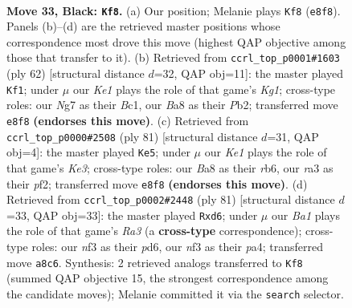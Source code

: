 \documentclass[11pt]{article}
\begin{document}
\clearpage

\begin{figure}[p]\centering
\begin{subfigure}{0.46\textwidth}\centering
\resizebox{\linewidth}{!}{%
\newchessgame
\chessboard[
  setfen={b3k3/P4pn1/6p1/4P3/5K2/R4N1P/4r3/3N4 b - - 2 33},
  showmover=false,
  pgfstyle=straightmove, color=movearrow, markmove={e8-f8}
]}
\caption{}
\end{subfigure}\hfill
\begin{subfigure}{0.46\textwidth}\centering
\resizebox{\linewidth}{!}{%
\newchessgame
\chessboard[
  setfen={r3n3/4pk2/2R3p1/8/p7/6P1/1P3P2/2B3K1 w - - 0 32},
  showmover=false,
  pgfstyle=straightmove, color=movearrow, markmove={g1-f1}
]}
\caption{}
\end{subfigure}
\\[4pt]
\begin{subfigure}{0.46\textwidth}\centering
\resizebox{\linewidth}{!}{%
\newchessgame
\chessboard[
  setfen={3r4/8/1R2k3/p4p2/5n2/2N5/PPK2P2/8 b - - 4 41},
  showmover=false,
  pgfstyle=straightmove, color=movearrow, markmove={e6-e5}
]}
\caption{}
\end{subfigure}\hfill
\begin{subfigure}{0.46\textwidth}\centering
\resizebox{\linewidth}{!}{%
\newchessgame
\chessboard[
  setfen={5k2/3n2p1/r2P1p2/8/P1RN2P1/1p6/8/1K6 b - - 3 41},
  showmover=false,
  pgfstyle=straightmove, color=movearrow, markmove={a6-d6}
]}
\caption{}
\end{subfigure}
\caption{\textbf{Move 33, Black: \texttt{Kf8}.} (a) Our position; Melanie plays \texttt{Kf8} (\texttt{e8f8}). Panels (b)--(d) are the retrieved master positions whose correspondence most drove this move (highest QAP objective among those that transfer to it). (b) Retrieved from \texttt{ccrl\_top\_p0001\#1603} (ply 62) [structural distance $d$=32, QAP obj=11]: the master played \texttt{Kf1}; under $\mu$ our \emph{Ke1} plays the role of that game's \emph{Kg1}; cross-type roles: our \emph{N}g7 as their \emph{B}c1, our \emph{B}a8 as their \emph{P}b2; transferred move \texttt{e8f8} \textbf{(endorses this move)}. (c) Retrieved from \texttt{ccrl\_top\_p0000\#2508} (ply 81) [structural distance $d$=31, QAP obj=4]: the master played \texttt{Ke5}; under $\mu$ our \emph{Ke1} plays the role of that game's \emph{Ke3}; cross-type roles: our \emph{B}a8 as their \emph{r}b6, our \emph{r}a3 as their \emph{p}f2; transferred move \texttt{e8f8} \textbf{(endorses this move)}. (d) Retrieved from \texttt{ccrl\_top\_p0002\#2448} (ply 81) [structural distance $d$=33, QAP obj=33]: the master played \texttt{Rxd6}; under $\mu$ our \emph{Ba1} plays the role of that game's \emph{Ra3} (a \textbf{cross-type} correspondence); cross-type roles: our \emph{n}f3 as their \emph{p}d6, our \emph{n}f3 as their \emph{p}a4; transferred move \texttt{a8c6}. Synthesis: 2 retrieved analogs transferred to \texttt{Kf8} (summed QAP objective 15, the strongest correspondence among the candidate moves); Melanie committed it via the \texttt{search} selector.}
\label{fig:thought-m65}
\end{figure}
\end{document}

